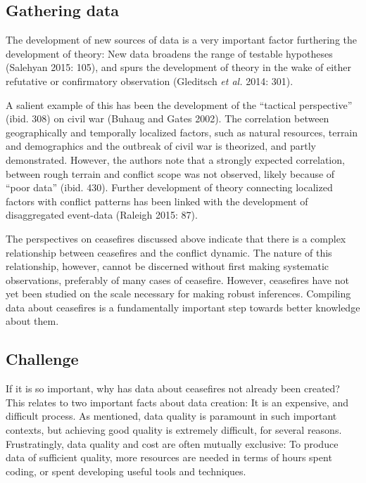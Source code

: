 \documentclass[12pt,twoside]{reedthesis}
\begin{document}
\subsection{Gathering data}\label{gathering-data}

The development of new sources of data is a very important factor
furthering the development of theory: New data broadens the range of
testable hypotheses (Salehyan 2015: 105), and spurs the development of
theory in the wake of either refutative or confirmatory observation
(Gleditsch \emph{et al.} 2014: 301).

A salient example of this has been the development of the ``tactical
perspective'' (ibid. 308) on civil war (Buhaug and Gates 2002). The
correlation between geographically and temporally localized factors,
such as natural resources, terrain and demographics and the outbreak of
civil war is theorized, and partly demonstrated. However, the authors
note that a strongly expected correlation, between rough terrain and
conflict scope was not observed, likely because of ``poor data'' (ibid.
430). Further development of theory connecting localized factors with
conflict patterns has been linked with the development of disaggregated
event-data (Raleigh 2015: 87).

The perspectives on ceasefires discussed above indicate that there is a
complex relationship between ceasefires and the conflict dynamic. The
nature of this relationship, however, cannot be discerned without first
making systematic observations, preferably of many cases of ceasefire.
However, ceasefires have not yet been studied on the scale necessary for
making robust inferences. Compiling data about ceasefires is a
fundamentally important step towards better knowledge about them.

\subsection{Challenge}\label{challenge}

If it is so important, why has data about ceasefires not already been
created? This relates to two important facts about data creation: It is
an expensive, and difficult process. As mentioned, data quality is
paramount in such important contexts, but achieving good quality is
extremely difficult, for several reasons. Frustratingly, data quality
and cost are often mutually exclusive: To produce data of sufficient
quality, more resources are needed in terms of hours spent coding, or
spent developing useful tools and techniques.
\end{document}
